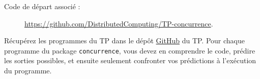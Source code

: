 
\begingroup

\begin{description}
\item[Code de départ associé :] \url{https://github.com/DistributedComputing/TP-concurrence}.
\end{description}

Récupérez les programmes du TP dans le dépôt \href{https://github.com/DistributedComputing/TP-concurrence}{GitHub} du TP.
Pour chaque programme du package \texttt{concurrence}, vous devez en comprendre le code,
prédire les sorties possibles, et ensuite seulement confronter vos prédictions à l'exécution du programme.

\endgroup
\endinput

